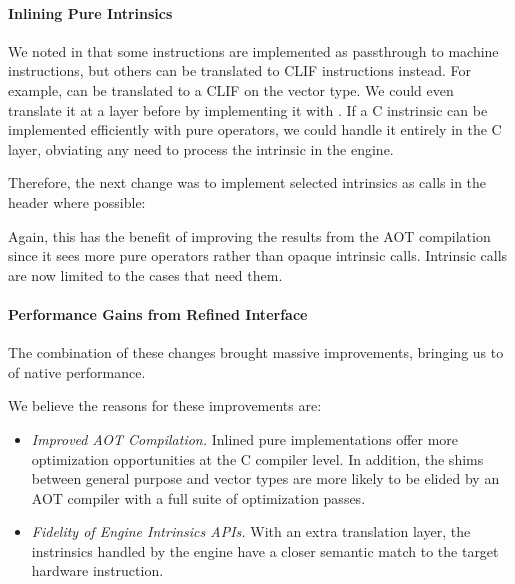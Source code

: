 \newcommand{\changeinline}{Inlining Pure \wasm Intrinsics}
\paragraph{\changeinline}

We noted in  that some instructions are implemented as
passthrough to machine instructions, but others can be translated to CLIF
instructions instead. For example,  can be translated to a CLIF
 on the  vector type.  We could even translate it at a
layer before by implementing it with \wasm {}. If a C instrinsic
can be implemented efficiently with pure \wasm operators, we could handle it
entirely in the C layer, obviating any need to process the intrinsic in the engine.

Therefore, the next change was to implement selected intrinsics as 
calls in the header where possible:
%

Again, this has the benefit of improving the results from the AOT compilation
since it sees more pure \wasm operators rather than opaque intrinsic calls.
Intrinsic calls are now limited to the cases that need them.

\paragraph{Performance Gains from Refined Interface}

The combination of these changes brought massive improvements, bringing us to
\MetricInlineWasmtimeHwwasmDivNative of native performance.

\begin{center}

\end{center}

We believe the reasons for these improvements are:
%
\begin{itemize}
    \item \emph{Improved AOT Compilation.}
        Inlined pure \wasm implementations offer more optimization opportunities
        at the C compiler level.  In addition, the shims between general purpose
        and vector types are more likely to be elided by an AOT compiler with a
        full suite of optimization passes.
    \item \emph{Fidelity of Engine Intrinsics APIs.}
        With an extra translation layer, the instrinsics handled by the engine
        have a closer semantic match to the target hardware instruction.
\end{itemize}

